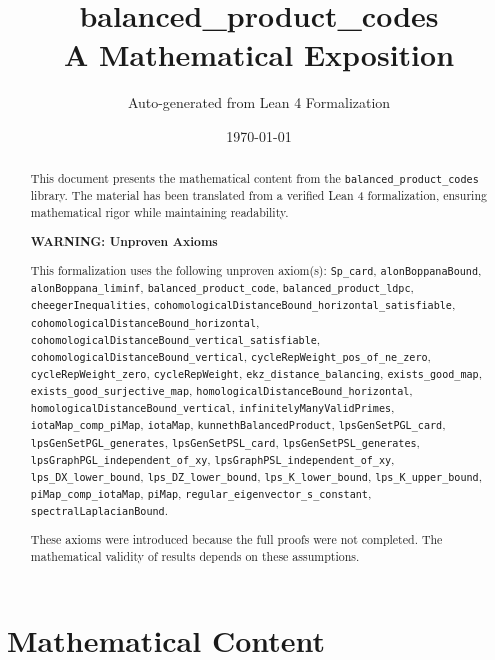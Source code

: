 \documentclass[11pt]{article}
\title{balanced\_product\_codes\\[0.5em]\large A Mathematical Exposition}
\author{Auto-generated from Lean 4 Formalization}
\date{\today}
\theoremstyle{plain}
\theoremstyle{definition}
\theoremstyle{remark}
\begin{document}
\maketitle

\begin{abstract}
This document presents the mathematical content from the \texttt{balanced\_product\_codes} library.
The material has been translated from a verified Lean 4 formalization,
ensuring mathematical rigor while maintaining readability.

\vspace{0.5em}
\noindent\textbf{\color{red}WARNING: Unproven Axioms}

\noindent This formalization uses the following unproven axiom(s): \texttt{Sp\_card}, \texttt{alonBoppanaBound}, \texttt{alonBoppana\_liminf}, \texttt{balanced\_product\_code}, \texttt{balanced\_product\_ldpc}, \texttt{cheegerInequalities}, \texttt{cohomologicalDistanceBound\_horizontal\_satisfiable}, \texttt{cohomologicalDistanceBound\_horizontal}, \texttt{cohomologicalDistanceBound\_vertical\_satisfiable}, \texttt{cohomologicalDistanceBound\_vertical}, \texttt{cycleRepWeight\_pos\_of\_ne\_zero}, \texttt{cycleRepWeight\_zero}, \texttt{cycleRepWeight}, \texttt{ekz\_distance\_balancing}, \texttt{exists\_good\_map}, \texttt{exists\_good\_surjective\_map}, \texttt{homologicalDistanceBound\_horizontal}, \texttt{homologicalDistanceBound\_vertical}, \texttt{infinitelyManyValidPrimes}, \texttt{iotaMap\_comp\_piMap}, \texttt{iotaMap}, \texttt{kunnethBalancedProduct}, \texttt{lpsGenSetPGL\_card}, \texttt{lpsGenSetPGL\_generates}, \texttt{lpsGenSetPSL\_card}, \texttt{lpsGenSetPSL\_generates}, \texttt{lpsGraphPGL\_independent\_of\_xy}, \texttt{lpsGraphPSL\_independent\_of\_xy}, \texttt{lps\_DX\_lower\_bound}, \texttt{lps\_DZ\_lower\_bound}, \texttt{lps\_K\_lower\_bound}, \texttt{lps\_K\_upper\_bound}, \texttt{piMap\_comp\_iotaMap}, \texttt{piMap}, \texttt{regular\_eigenvector\_s\_constant}, \texttt{spectralLaplacianBound}.

\noindent These axioms were introduced because the full proofs were not completed.
The mathematical validity of results depends on these assumptions.

\end{abstract}

\tableofcontents
\newpage

\section{Mathematical Content}
\end{document}
